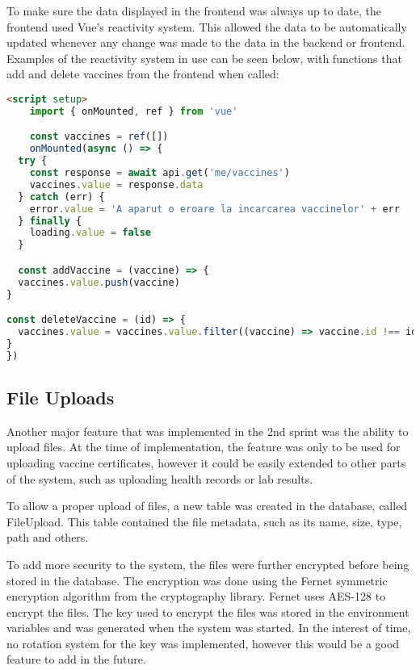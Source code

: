 To make sure the data displayed in the frontend was always up to date, the frontend used Vue's reactivity system. This allowed the data to be automatically updated whenever any change was made to the data in the backend or frontend. Examples of the reactivity system in use can be seen below, with functions that add and delete vaccines from the frontend when called:

\begin{lstlisting}[language=HTML, caption=Vue Reactivity System]
    <script setup>
    import { onMounted, ref } from 'vue'

    const vaccines = ref([])
    onMounted(async () => {
  try {
    const response = await api.get('me/vaccines')
    vaccines.value = response.data
  } catch (err) {
    error.value = 'A aparut o eroare la incarcarea vaccinelor' + err
  } finally {
    loading.value = false
  }

  const addVaccine = (vaccine) => {
  vaccines.value.push(vaccine)
}

const deleteVaccine = (id) => {
  vaccines.value = vaccines.value.filter((vaccine) => vaccine.id !== id)
}
})
\end{lstlisting}

\subsection{File Uploads}

Another major feature that was implemented in the 2nd sprint was the ability to upload files. At the time of implementation, the feature was only to be used for uploading vaccine certificates, however it could be easily extended to other parts of the system, such as uploading health records or lab results.


To allow a proper upload of files, a new table was created in the database, called FileUpload. This table contained the file metadata, such as its name, size, type, path and others. 

To add more security to the system, the files were further encrypted before being stored in the database. The encryption was done using the Fernet symmetric encryption algorithm from the cryptography library. Fernet uses AES-128 to encrypt the files. %
The key used to encrypt the files was stored in the environment variables and was generated when the system was started. In the interest of time, no rotation system for the key was implemented, however this would be a good feature to add in the future. 

